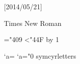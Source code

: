\addModuleCode
{
    \usepackage{fontspec}
    \usepackage{polyglossia}[2014/05/21]
    \usepackage{xecyr}
    \usepackage{mathtext}
    \usepackage{indentfirst}
    \usepackage{misccorr}

} {
    \setmainlanguage[babelshorthands=true,indentfirst=true]{russian}

    \setmainfont {Times New Roman}
    \setsansfont {Arial} 
    \setmonofont {Courier New} 

    \newfontfamily{\cyrillicfont}  {Times New Roman} 

    \newcommand{\makecyrmathletter}[1]
    {
        \begingroup\lccode`a=#1\lowercase{\endgroup
        \Umathcode`a}="0 \csname symcyrletters\endcsname\space #1
    }
    ="409
    \loop\ifnum{}<"44F
        \advance{} by 1
        \makecyrmathletter{\count255}
    \repeat
}
